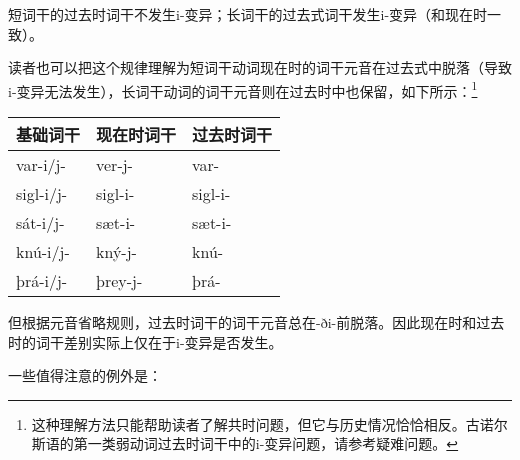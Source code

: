 \begin{info}
    短词干的过去时词干不发生i-变异；长词干的过去式词干发生i-变异（和现在时一致）。
\end{info}

读者也可以把这个规律理解为短词干动词现在时的词干元音在过去式中脱落（导致i-变异无法发生），长词干动词的词干元音则在过去时中也保留，如下所示：\footnote{这种理解方法只能帮助读者了解共时问题，但它与历史情况恰恰相反。古诺尔斯语的第一类弱动词过去时词干中的i-变异问题，请参考疑难问题。}

\begin{longtable}{lll}
    \toprule
    基础词干      & 现在时词干   & 过去时词干   \\
    \midrule
    \endhead
    \bottomrule
    \endfoot
    var-i/j-  & ver-j-  & var-    \\
    sigl-i/j- & sigl-i- & sigl-i- \\
    sát-i/j-  & sæt-i-  & sæt-i-  \\
    knú-i/j-  & kný-j-  & knú-    \\
    þrá-i/j-  & þrey-j- & þrá-    \\
\end{longtable}

但根据元音省略规则，过去时词干的词干元音总在-ði-前脱落。因此现在时和过去时的词干差别实际上仅在于i-变异是否发生。

一些值得注意的例外是：


